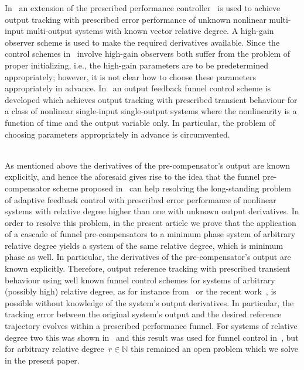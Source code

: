 \documentclass[ envcountsect, envcountsame]{svjour3}
\newcommand{\N}{\mathbb{N}}
\begin{document}
%
In~\cite{DimaBech20} an extension of the prescribed performance controller~\cite{BechRovi14} is used to achieve output tracking with prescribed error performance of unknown nonlinear multi-input multi-output systems with known vector relative degree.
A high-gain observer scheme is used to make the required derivatives available. 
%
Since the control schemes in~\cite{ChowKhal19,DimaBech20} involve high-gain observers both suffer from the problem of proper initializing, i.e., the high-gain parameters are to be predetermined appropriately; however, it is not clear how to choose these parameters appropriately in advance.
%
In~\cite{LiuSu21} an output feedback funnel control scheme is developed which achieves output tracking with prescribed transient behaviour for a class of nonlinear single-input single-output systems where the nonlinearity is a function of time and the output variable only. In particular, the problem of choosing parameters appropriately in advance is circumvented.
%


\ \\
As mentioned above the derivatives of the pre-compensator's output are known explicitly, and hence the aforesaid gives rise to the idea that the funnel pre-compensator scheme proposed in~\cite{BergReis18b} can help resolving the long-standing problem of adaptive feedback control with prescribed error performance of nonlinear systems with relative degree higher than one with unknown output derivatives.
%
In order to resolve this problem, in the present article we prove that the application of a cascade of funnel pre-compensators to a minimum phase system of arbitrary relative degree yields a system of the same relative degree, which is minimum phase as well. 
In particular, the derivatives of the pre-compensator's output are known explicitly.
Therefore, output reference tracking with prescribed transient behaviour using well known funnel control schemes for systems of arbitrary (possibly high) relative degree, as for instance from~\cite{BergLe18a} or the recent work~\cite{BergIlch21}, is possible without knowledge of the system's output derivatives. 
In particular, the tracking error between the original system's output and the desired reference trajectory evolves within a prescribed performance funnel.
For systems of relative degree two this was shown in~\cite{BergReis18b} and this result was used for funnel control in~\cite{BergReis18a}, but for arbitrary relative degree~$r\in\N$ this remained an open problem which we solve in the present paper. 
\end{document}
